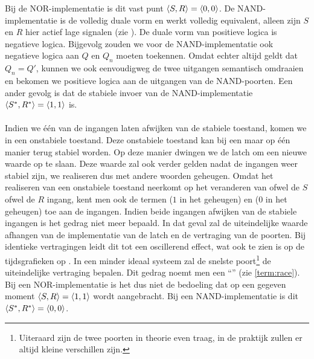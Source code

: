 Bij de NOR-implementatie is dit vast punt $\left\langle S,R \right\rangle=\left\langle 0,0 \right\rangle$. De NAND-implementatie is de volledig duale vorm en werkt volledig equivalent, alleen zijn $S$ en $R$ hier actief lage signalen (zie ). De duale vorm van positieve logica is negatieve logica. Bijgevolg zouden we voor de NAND-implementatie ook negatieve logica aan $Q$ en $Q_n$ moeten toekennen. Omdat echter altijd geldt dat $Q_n=Q'$, kunnen we ook eenvoudigweg de twee uitgangen semantisch omdraaien en bekomen we positieve logica aan de uitgangen van de NAND-poorten. Een ander gevolg is dat de stabiele invoer van de NAND-implementatie $\left\langle S^*,R^* \right\rangle=\left\langle 1,1 \right\rangle$ is.

\paragraph{}
Indien we \'e\'en van de ingangen laten afwijken van de stabiele toestand, komen we in een onstabiele toestand. Deze onstabiele toestand kan bij een maar op \'e\'en manier terug stabiel worden. Op deze manier dwingen we de latch om een nieuwe waarde op te slaan. Deze waarde zal ook verder gelden nadat de ingangen weer stabiel zijn, we realiseren dus met andere woorden geheugen. Omdat het realiseren van een onstabiele toestand neerkomt op het veranderen van ofwel de $S$ ofwel de $R$ ingang, kent men ook de termen  ($1$ in het geheugen) en  ($0$ in het geheugen) toe aan de ingangen. Indien beide ingangen afwijken van de stabiele ingangen is het gedrag niet meer bepaald. In dat geval zal de uiteindelijke waarde afhangen van de implementatie van de latch en de vertraging van de poorten. Bij identieke vertragingen leidt dit tot een oscillerend effect, wat ook te zien is op de tijdsgrafieken op . In een minder ideaal systeem zal de snelste poort\footnote{Uiteraard zijn de twee poorten in theorie even traag, in de praktijk zullen er altijd kleine verschillen zijn.} de uiteindelijke vertraging bepalen. Dit gedrag noemt men een ``'' (zie \ref{term:race}). Bij een NOR-implementatie is het dus niet de bedoeling dat op een gegeven moment $\left\langle S,R \right\rangle=\left\langle 1,1 \right\rangle$ wordt aangebracht. Bij een NAND-implementatie is dit $\left\langle S^*,R^* \right\rangle=\left\langle 0,0 \right\rangle$.%

